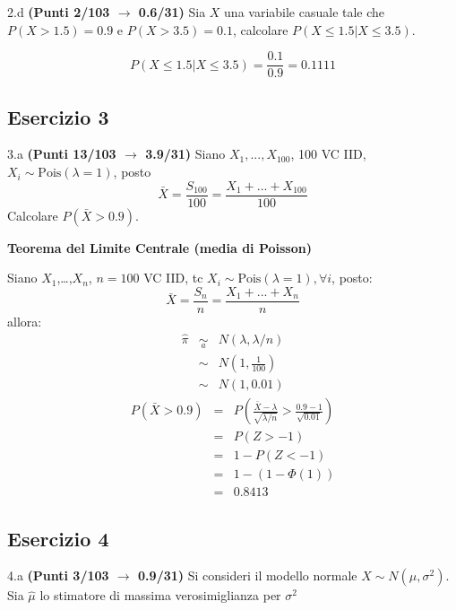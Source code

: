 \documentclass[
  11pt,
]{book}
\theoremstyle{mytheoremstyle}
\theoremstyle{mydefstyle}
\newenvironment{sol}
  {
  \begin{tcolorbox}[enhanced,breakable,arc=0.1mm,boxrule=1pt,colback=white,colframe=iblue,
  title=\bf \fontfamily{lmss}\selectfont \hspace{.5 cm} Soluzione,drop fuzzy shadow]

}{
\end{tcolorbox}
  }
\begin{document}
2.d \textbf{(Punti 2/103 \(\rightarrow\) 0.6/31)} Sia \(X\) una variabile casuale tale che \(P(X>1.5)=0.9\) e \(P(X>3.5)=0.1\),
calcolare \(P(X\leq 1.5|X\leq 3.5)\).

\begin{sol}
\[
P(X\leq 1.5|X\leq 3.5) = \frac{0.1}{0.9}=0.1111
\]

\end{sol}

\subsection{Esercizio 3}\label{esercizio-3-43}

3.a \textbf{(Punti 13/103 \(\rightarrow\) 3.9/31)} Siano \(X_1,...,X_{100}\), 100 VC IID, \(X_i\sim \text{Pois}(\lambda=1)\), posto
\[
\bar X=\frac{S_{100}}{100} = \frac{X_1+ ... +X_{100}}{100}
\]
Calcolare \(P(\bar X>0.9)\).

\begin{sol}
\textbf{Teorema del Limite Centrale (media di Poisson)}

Siano \(X_1\),\ldots,\(X_n\), \(n=100\) VC IID, tc \(X_i\sim\text{Pois}(\lambda=1)\)\(,\forall i\), posto:
\[
      \bar X=\frac{S_n}n = \frac{X_1 + ... + X_n}n
      \]
allora:\begin{eqnarray*}
  \hat\pi & \mathop{\sim}\limits_{a}& N(\lambda,\lambda/n) \\
  &\sim & N\left(1,\frac{1}{100}\right) \\
     &\sim & N(1,0.01) 
  \end{eqnarray*}\begin{eqnarray*}
      P( \bar X   >   0.9 ) 
        &=& P\left(  \frac { \bar X  -  \lambda }{ \sqrt{\lambda/n} }  >  \frac { 0.9  -  1 }{\sqrt{ 0.01 }} \right)  \\
                 &=& P\left(  Z   >   -1 \right) \\    &=& 1-P(Z< -1 )\\ 
                 &=&  1-(1-\Phi( 1 )) \\ &=&  0.8413 
      \end{eqnarray*}

\end{sol}

\subsection{Esercizio 4}\label{esercizio-4-43}

4.a \textbf{(Punti 3/103 \(\rightarrow\) 0.9/31)} Si consideri il modello normale \(X\sim N(\mu,\sigma^2)\). Sia \(\hat\mu\) lo stimatore di massima verosimiglianza per \(\sigma^2\)
\end{document}
